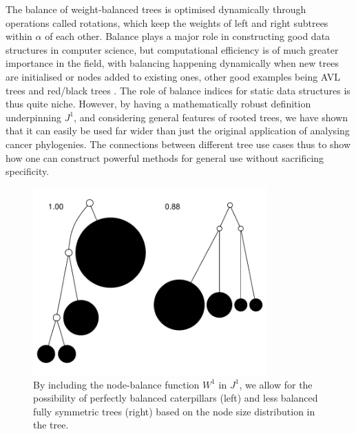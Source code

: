 The balance of weight-balanced trees is optimised dynamically through operations called rotations, which keep the weights of left and right subtrees within $\alpha$ of each other. Balance plays a major role in constructing good data structures in computer science, but computational efficiency is of much greater importance in the field, with balancing happening dynamically when new trees are initialised or nodes added to existing ones, other good examples being AVL trees and red/black trees \cite{noauthor_art_nodate}. The role of balance indices for static data structures is thus quite niche. However, by having a mathematically robust definition underpinning $J^1$, and considering general features of rooted trees, we have shown that it can easily be used far wider than just the original application of analysing cancer phylogenies. The connections between different tree use cases thus to show how one can construct powerful methods for general use without sacrificing specificity.

\begin{figure}
    \centering
    \includegraphics[width=0.8\textwidth]{Chapter_2/figures/balcat.pdf}
    \caption{By including the node-balance function $W^1$ in $J^1$, we allow for the possibility of perfectly balanced caterpillars (left) and less balanced fully symmetric trees (right) based on the node size distribution in the tree.}
    \label{balcat}
\end{figure}

